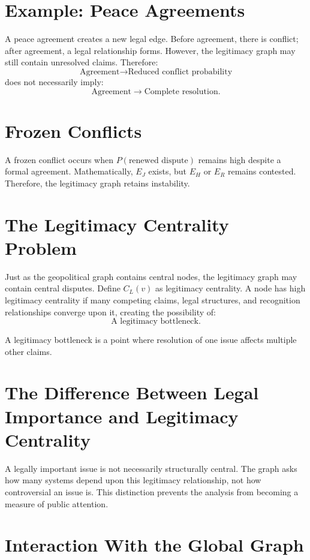 \documentclass[11pt,openany]{book}
\theoremstyle{plain}
\theoremstyle{definition}
\begin{document}
\section*{Example: Peace Agreements}

A peace agreement creates a new legal edge. Before agreement, there is conflict; after agreement, a legal relationship forms. However, the legitimacy graph may still contain unresolved claims. Therefore:
\[
\text{Agreement} \longrightarrow \text{Reduced conflict probability}
\]
does not necessarily imply:
\[
\text{Agreement} \longrightarrow \text{Complete resolution}.
\]

\section*{Frozen Conflicts}

A frozen conflict occurs when \(P(\text{renewed dispute})\) remains high despite a formal agreement. Mathematically, \(E_J\) exists, but \(E_H\) or \(E_R\) remains contested. Therefore, the legitimacy graph retains instability.

\section*{The Legitimacy Centrality Problem}

Just as the geopolitical graph contains central nodes, the legitimacy graph may contain central disputes. Define \(C_L(v)\) as legitimacy centrality. A node has high legitimacy centrality if many competing claims, legal structures, and recognition relationships converge upon it, creating the possibility of:
\[
\boxed{
\text{A legitimacy bottleneck.}
}
\]

A legitimacy bottleneck is a point where resolution of one issue affects multiple other claims.

\section*{The Difference Between Legal Importance and Legitimacy Centrality}

A legally important issue is not necessarily structurally central. The graph asks how many systems depend upon this legitimacy relationship, not how controversial an issue is. This distinction prevents the analysis from becoming a measure of public attention.

\section*{Interaction With the Global Graph}
\end{document}
